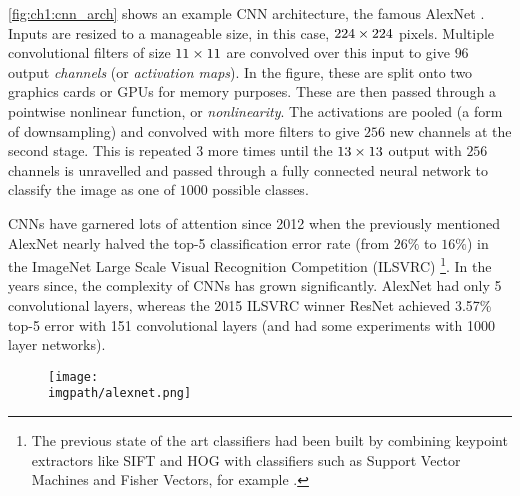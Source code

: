 \autoref{fig:ch1:cnn_arch} shows an example CNN
architecture, the famous AlexNet \cite{krizhevsky_imagenet_2012}. Inputs are resized to a
manageable size, in this case, $224\times 224$ pixels. Multiple convolutional
filters of size $11\times 11$ are convolved over this input to give $96$ output
\emph{channels} (or \emph{activation maps}). In the figure, these are split onto two
graphics cards or GPUs for memory purposes. These are then passed through a
pointwise nonlinear function, or \emph{nonlinearity}.
The activations are pooled (a form of downsampling) and convolved with more
filters to give $256$ new channels at the second stage. This is repeated 3 more
times until the $13\times 13$ output with $256$ channels is unravelled and passed
through a fully connected neural network to classify the image as one of $1000$
possible classes.

CNNs have garnered lots of attention since 2012 when the previously mentioned AlexNet
nearly halved the top-5 classification error rate (from $26\%$ to $16\%$)
in the ImageNet Large Scale Visual Recognition Competition (ILSVRC)
\cite{russakovsky_imagenet_2014}\footnote{The previous state of
the art classifiers had been built by combining keypoint extractors like
SIFT\cite{lowe_distinctive_2004} and HOG\cite{dalal_histograms_2005} with
classifiers such as Support Vector Machines\cite{cortes_support-vector_1995} and
Fisher Vectors\cite{sanchez_image_2013}, for example \cite{sanchez_high-dimensional_2011}.}.
In the years since, the complexity of CNNs has grown significantly. AlexNet had
only 5 convolutional layers, whereas the 2015 ILSVRC winner ResNet \cite{he_deep_2016}
achieved 3.57\% top-5 error with 151 convolutional layers (and had some
experiments with 1000 layer networks).

\begin{figure}
  \centering
    \texttt{[image: \\imgpath/alexnet.png]}
    \label{fig:ch1:cnn_arch}
  \end{figure}

